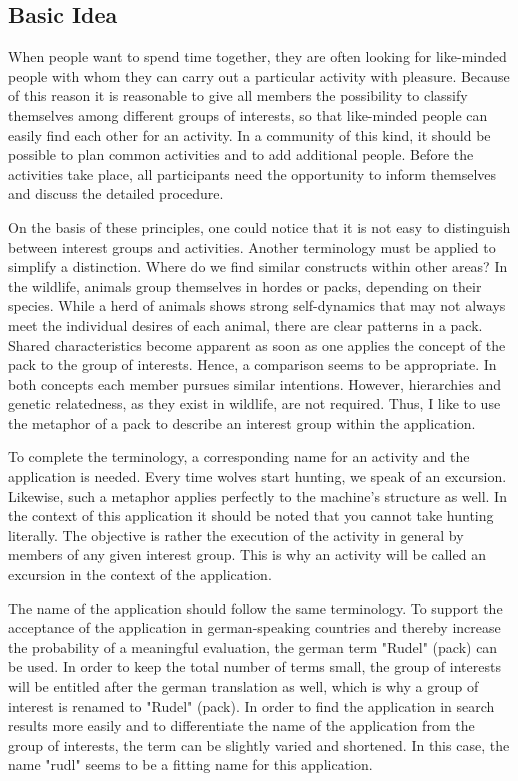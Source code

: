 \documentclass[12pt,numbers=noenddot,parskip,bibliography=totocnumbered,listof=totocnumbered]{scrreprt}
\begin{document}
\subsection{Basic Idea}
When people want to spend time together, they are often looking for like-minded people with whom they can carry out a particular activity with pleasure. Because of this reason it is reasonable to give all members the possibility to classify themselves among different groups of interests, so that like-minded people can easily find each other for an activity. In a community of this kind, it should be possible to plan common activities and to add additional people. Before the activities take place, all participants need the opportunity to inform themselves and discuss the detailed procedure. 

On the basis of these principles, one could notice that it is not easy to distinguish between interest groups and activities. Another terminology must be applied to simplify a distinction. Where do we find similar constructs within other areas? In the wildlife, animals group themselves in hordes or packs, depending on their species. While a herd of animals shows strong self-dynamics that may not always meet the individual desires of each animal, there are clear patterns in a pack. Shared characteristics become apparent as soon as one applies the concept of the pack to the group of interests. Hence, a comparison seems to be appropriate. In both concepts each member pursues similar intentions. However, hierarchies and genetic relatedness, as they exist in wildlife, are not required. Thus, I like to use the metaphor of a pack to describe an interest group within the application.

To complete the terminology, a corresponding name for an activity and the application is needed. Every time wolves start hunting, we speak of an excursion. Likewise, such a metaphor applies perfectly to the machine's structure as well. In the context of this application it should be noted that you cannot take hunting literally. The objective is rather the execution of the activity in general by members of any given interest group. This is why an activity will be called an excursion in the context of the application. 

The name of the application should follow the same terminology. To support the acceptance of the application in german-speaking countries and thereby increase the probability of a meaningful evaluation, the german term "Rudel" (pack) can be used. In order to keep the total number of terms small, the group of interests will be entitled after the german translation as well, which is why a group of interest is renamed to "Rudel" (pack). In order to find the application in search results more easily and to differentiate the name of the application from the group of interests, the term can be slightly varied and shortened. In this case, the name "rudl" seems to be a fitting name for this application.
\end{document}
